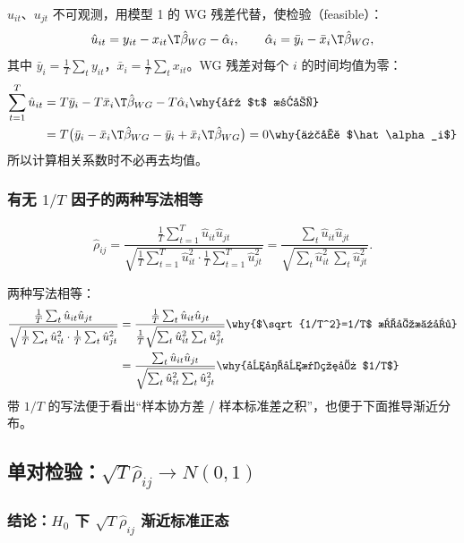$u_{it}$、$u_{jt}$ 不可观测，用模型 1 的 WG 残差代替，使检验（feasible）：
\[
\hat u_{it}=y_{it}-x_{it}\T\hat\beta_{WG}-\hat\alpha_i,\qquad \hat\alpha_i=\bar y_i-\bar x_i\T\hat\beta_{WG},
\]
其中 $\bar y_i=\frac1T\sum_ty_{it}$，$\bar x_i=\frac1T\sum_tx_{it}$。WG 残差对每个 $i$ 的时间均值为零：
\begin{align*}
\sum_{t=1}^T\hat u_{it} &= T\bar y_i-T\bar x_i\T\hat\beta_{WG}-T\hat\alpha_i \why{对 $t$ 求和}\\
&= T\big(\bar y_i-\bar x_i\T\hat\beta_{WG}-\bar y_i+\bar x_i\T\hat\beta_{WG}\big)=0 \why{代入 $\hat\alpha_i$}
\end{align*}
所以计算相关系数时不必再去均值。

\subsubsection{有无 \texorpdfstring{$1/T$}{1/T} 因子的两种写法相等}

\begin{defn}[残差的样本相关系数]\label{def:U14b-rhohat}
\begin{equation}\label{eq:U14b-rhohat}
\hat\rho_{ij}=\frac{\frac1T\sum_{t=1}^T\hat u_{it}\hat u_{jt}}{\sqrt{\frac1T\sum_{t=1}^T\hat u_{it}^2\cdot\frac1T\sum_{t=1}^T\hat u_{jt}^2}}
=\frac{\sum_t\hat u_{it}\hat u_{jt}}{\sqrt{\sum_t\hat u_{it}^2\,\sum_t\hat u_{jt}^2}} .
\end{equation}
\end{defn}
两种写法相等：
\begin{align*}
\frac{\frac1T\sum_t\hat u_{it}\hat u_{jt}}{\sqrt{\frac1T\sum_t\hat u_{it}^2\cdot\frac1T\sum_t\hat u_{jt}^2}}
&= \frac{\frac1T\sum_t\hat u_{it}\hat u_{jt}}{\frac1T\sqrt{\sum_t\hat u_{it}^2\sum_t\hat u_{jt}^2}} \why{$\sqrt{1/T^2}=1/T$ 提出根号}\\
&= \frac{\sum_t\hat u_{it}\hat u_{jt}}{\sqrt{\sum_t\hat u_{it}^2\sum_t\hat u_{jt}^2}} \why{分子分母约去 $1/T$}
\end{align*}
带 $1/T$ 的写法便于看出“样本协方差 / 样本标准差之积”，也便于下面推导渐近分布。

\subsection{单对检验：\texorpdfstring{$\sqrt T\hat\rho_{ij}\to N(0,1)$}{sqrt(T) rho-hat\_ij -> N(0,1)}}

\subsubsection{结论：\texorpdfstring{$H_0$}{H0} 下 \texorpdfstring{$\sqrt T\hat\rho_{ij}$}{sqrt(T) rho-hat\_ij} 渐近标准正态}

